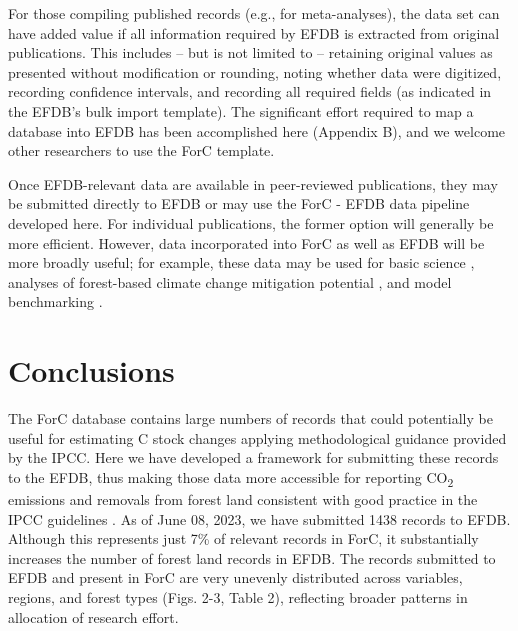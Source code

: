 \documentclass[, manuscript]{copernicus}
\begin{document}
For those compiling published records (e.g., for meta-analyses), the
data set can have added value if all information required by EFDB is
extracted from original publications. This includes -- but is not
limited to -- retaining original values as presented without
modification or rounding, noting whether data were digitized, recording
confidence intervals, and recording all required fields (as indicated in
the EFDB's bulk import template). The significant effort required to map
a database into EFDB has been accomplished here (Appendix B), and we
welcome other researchers to use the ForC template.

Once EFDB-relevant data are available in peer-reviewed publications,
they may be submitted directly to EFDB or may use the ForC - EFDB data
pipeline developed here. For individual publications, the former option
will generally be more efficient. However, data incorporated into ForC
as well as EFDB will be more broadly useful; for example, these data may
be used for basic science
\citep[e.g.,][]{banburymorgan_global_2021, anderson-teixeira_carbon_2021},
analyses of forest-based climate change mitigation potential
\citep[e.g.,][]{cook-patton_mapping_2020, goldstein_protecting_2020},
and model benchmarking \citep{fer_ecosystem_2021}.

\section{Conclusions}

The ForC database contains large numbers of records that could
potentially be useful for estimating C stock changes applying
methodological guidance provided by the IPCC. Here we have developed a
framework for submitting these records to the EFDB, thus making those
data more accessible for reporting CO\textsubscript{2} emissions and
removals from forest land consistent with good practice in the IPCC
guidelines \citep{ipcc_2006_2006, ipcc_2019_2019}. As of June 08, 2023,
we have submitted 1438 records to EFDB. Although this represents just
7\% of relevant records in ForC, it substantially increases the number
of forest land records in EFDB. The records submitted to EFDB and
present in ForC are very unevenly distributed across variables, regions,
and forest types (Figs. 2-3, Table 2), reflecting broader patterns in
allocation of research effort.
\end{document}
